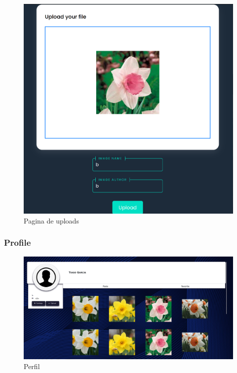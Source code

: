\documentclass{report}
\begin{document}
\begin{figure}[H]
    \centering
    \includegraphics[scale=0.2]{../images/uploads}
    \caption{Pagina de uploads}
    \label{fig:uploads}
\end{figure}

\subsubsection{Profile}

\begin{figure}[H]
    \centering
    \includegraphics[scale=0.2]{../images/profile}
    \caption{Perfil}
    \label{fig:profile}
\end{figure}
\end{document}

